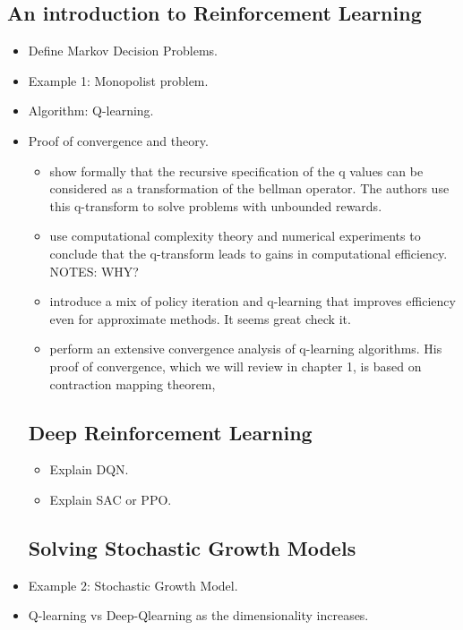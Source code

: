 \documentclass[11pt,english]{article}
\begin{document}
\subsection{An introduction to Reinforcement Learning}
\begin{itemize}
\item Define Markov Decision Problems.
\item Example 1: Monopolist problem.
\item Algorithm: Q-learning.
\item Proof of convergence and theory.
\begin{itemize}
\item \citet{ma2020} show formally that the recursive specification of
the q values can be considered as a transformation of the bellman
operator. The authors use this q-transform to solve problems with
unbounded rewards.
\item \citet{ma2021} use computational complexity theory and numerical
experiments to conclude that the q-transform leads to gains in computational
efficiency. NOTES: WHY?
\item \citet{bertsekas2012} introduce a mix of policy iteration and q-learning
that improves efficiency even for approximate methods. It seems great
check it.
\item \citet{tsitsiklis1994} perform an extensive convergence analysis
of q-learning algorithms. His proof of convergence, which we will
review in chapter 1, is based on contraction mapping theorem,
\end{itemize}

\subsection{Deep Reinforcement Learning}

\begin{itemize}
	\item Explain DQN.
	\item Explain SAC or PPO.
\end{itemize}

\subsection{Solving Stochastic Growth Models}
\item Example 2: Stochastic Growth Model.
\item Q-learning vs Deep-Qlearning as the dimensionality increases.
\end{itemize}
\end{document}
